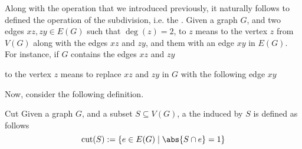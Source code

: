 \documentclass[a4paper, 12pt]{report}
\begin{document}
    Along with the  operation that we introduced previously, it naturally follows to defined the  operation of the subdivision, i.e. the . Given a graph $G$, and two edges $xz, zy \in E(G)$ such that $\deg(z) = 2$, to  $z$ means to  the vertex $z$ from $V(G)$ along with the edges $xz$ and $zy$, and  them with an edge $xy$ in $E(G)$. For instance, if $G$ contains the edges $xz$ and $zy$

    \begin{figure}[H]
        \centering
    \end{figure}

    to  the vertex $z$ means to replace $xz$ and $zy$ in $G$ with the following edge $xy$

    \begin{figure}[H]
        \centering
    \end{figure}

    Now, consider the following definition.

    \begin{frameddefn}{Cut}
        Given a graph $G$, and a subset $S \subseteq V(G)$, a the  induced by $S$ is defined as follows $$\mathrm{cut}(S) := \{e \in E(G) \mid \abs{S \cap e} = 1\}$$
    \end{frameddefn}
\end{document}
